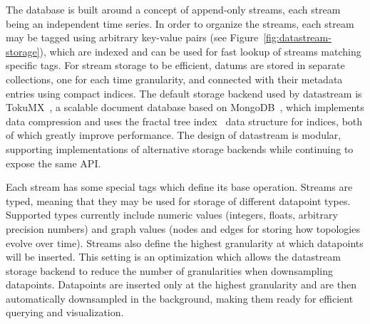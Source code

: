 \documentclass[5p,sort&compress]{elsarticle}
\begin{document}
The database is built around a concept of append-only streams, each stream being an independent time series.
In order to organize the streams, each stream may be tagged using arbitrary key-value pairs (see Figure~\ref{fig:datastream-storage}), which are indexed and can be used for fast lookup of streams matching specific tags.
For stream storage to be efficient, datums are stored in separate collections, one for each time granularity, and connected with their metadata entries using compact indices.
The default storage backend used by datastream is TokuMX~\cite{TokuMX_2007}, a scalable document database based on MongoDB~\cite{MongoDB_2007}, which implements data compression and uses the fractal tree index~\cite{Brodal_2003,Bender_2007} data structure for indices, both of which greatly improve performance.
The design of datastream is modular, supporting implementations of alternative storage backends while continuing to expose the same API.

Each stream has some special tags which define its base operation.
Streams are typed, meaning that they may be used for storage of different datapoint types.
Supported types currently include numeric values (integers, floats, arbitrary precision numbers) and graph values (nodes and edges for storing how topologies evolve over time).
Streams also define the highest granularity at which datapoints will be inserted.
This setting is an optimization which allows the datastream storage backend to reduce the number of granularities when downsampling datapoints.
Datapoints are inserted only at the highest granularity and are then automatically downsampled in the background, making them ready for efficient querying and visualization.

\end{document}
